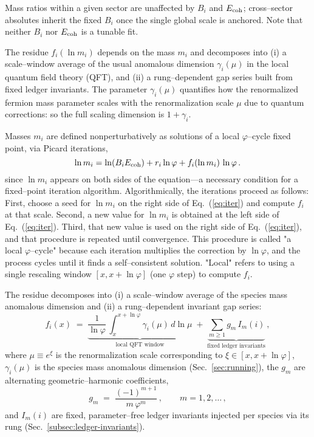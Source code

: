 \documentclass[%
  amsmath,amssymb,
  aps,
 prb,
 floatfix, showkeys
 ]{revtex4-2}
\begin{document}
 Mass ratios within a given sector are unaffected by $B_i$ and $E_{\rm coh}$; cross–sector absolutes
 inherit the fixed $B_i$ once the single global scale is anchored.
 Note that neither $B_i$ nor $E_{\rm coh}$ is a tunable fit.
 
 The residue  $f_i(\ln m_i)$ depends on the mass $m_i$ and decomposes into
 (i)  a scale–window average of the usual anomalous dimension $\gamma_i(\mu)$ in the
      local quantum field theory (QFT), and
 (ii) a rung–dependent gap series built from fixed ledger invariants.
   The parameter  $\gamma_i(\mu)$ quantifies how the renormalized fermion mass parameter scales with the
 renormalization scale $\mu$ due to quantum corrections: so the full scaling dimension is $1 + \gamma_i$.
 
 Masses $m_i$ are defined nonperturbatively as solutions of a
 local $\varphi$–cycle fixed point, via Picard iterations, 
 \begin{equation}
   \ln m_i = \ln(B_iE_{\rm coh}) + r_i\ln\varphi + f_i(\ln m_i)\,\ln\varphi\,.
 \label{eq:iter}
 \end{equation}
 since $\ln m_i$ appears on both sides of the equation—a necessary condition for a
 fixed–point iteration algorithm. Algorithmically, the iterations proceed as follows:
 First, choose a seed for  $\ln m_i$ on the right side of Eq.~(\ref{eq:iter}) and  compute $f_i$ at that scale. Second,
 a new value for $\ln m_i$ is obtained at the left side of Eq.~(\ref{eq:iter}). Third,
 that new value is used on the right side of Eq.~(\ref{eq:iter}), and that procedure is
 repeated until convergence. This procedure is called "a local $\varphi$–cycle"
 because each iteration multiplies the correction by
     $\ln \varphi$, and the process cycles until it finds a self–consistent solution. 
 "Local" refers to using a single rescaling window $[x, x+\ln \varphi]$ (one $\varphi$ step)
 to compute $f_i$.
 
 The residue decomposes into (i) a scale–window average of the species mass anomalous dimension and
 (ii) a rung–dependent invariant gap series:
 \begin{equation}
   f_i(x) \;=\; \underbrace{\frac{1}{\ln\varphi}\,\int_{x}^{x+\ln\varphi}\!\gamma_i(\mu)\,d\ln\mu}_{\text{local QFT window}}
   \;+\; \underbrace{\sum_{m\ge 1} g_m\,I_m(i)}_{\text{fixed ledger invariants}}\,,
   \label{eq:residue_local}
 \end{equation}
 where $\mu \equiv e^{\xi}$ is the renormalization scale corresponding to $\xi\in[x,x+\ln\varphi]$,
 $\gamma_i(\mu)$ is the species mass anomalous dimension (Sec.~\ref{sec:running}),
 the $g_m$ are alternating geometric–harmonic coefficients,
 \begin{equation}
   g_m \;=\; \frac{(-1)^{m+1}}{m\,\varphi^{m}}\,, \qquad m=1,2,\dots\,,
   \label{eq:gap_coeffs}
 \end{equation}
 and $I_m(i)$ are fixed, parameter–free ledger invariants injected per species via its rung (Sec.~\ref{subsec:ledger-invariants}).
 
\end{document}
